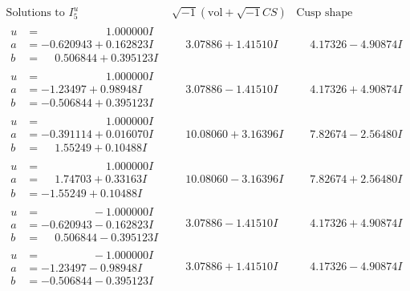 \documentclass[1p]{elsarticle_modified}
\theoremstyle{definition}
\newcommand{\I}{\sqrt{-1}}
\begin{document}
$$\begin{array}{c|c|c}  
\text{Solutions to }I^u_{5}& \I (\text{vol} + \sqrt{-1}CS) & \text{Cusp shape}\\
 \hline 
\begin{aligned}
u &= \phantom{-0.000000 -}1.000000 I \\
a &= -0.620943 + 0.162823 I \\
b &= \phantom{-}0.506844 + 0.395123 I\end{aligned}
 & \phantom{-}3.07886 + 1.41510 I & \phantom{-}4.17326 - 4.90874 I \\ \hline\begin{aligned}
u &= \phantom{-0.000000 -}1.000000 I \\
a &= -1.23497 + 0.98948 I \\
b &= -0.506844 + 0.395123 I\end{aligned}
 & \phantom{-}3.07886 - 1.41510 I & \phantom{-}4.17326 + 4.90874 I \\ \hline\begin{aligned}
u &= \phantom{-0.000000 -}1.000000 I \\
a &= -0.391114 + 0.016070 I \\
b &= \phantom{-}1.55249 + 0.10488 I\end{aligned}
 & \phantom{-}10.08060 + 3.16396 I & \phantom{-}7.82674 - 2.56480 I \\ \hline\begin{aligned}
u &= \phantom{-0.000000 -}1.000000 I \\
a &= \phantom{-}1.74703 + 0.33163 I \\
b &= -1.55249 + 0.10488 I\end{aligned}
 & \phantom{-}10.08060 - 3.16396 I & \phantom{-}7.82674 + 2.56480 I \\ \hline\begin{aligned}
u &= \phantom{-0.000000 } -1.000000 I \\
a &= -0.620943 - 0.162823 I \\
b &= \phantom{-}0.506844 - 0.395123 I\end{aligned}
 & \phantom{-}3.07886 - 1.41510 I & \phantom{-}4.17326 + 4.90874 I \\ \hline\begin{aligned}
u &= \phantom{-0.000000 } -1.000000 I \\
a &= -1.23497 - 0.98948 I \\
b &= -0.506844 - 0.395123 I\end{aligned}
 & \phantom{-}3.07886 + 1.41510 I & \phantom{-}4.17326 - 4.90874 I \\ \hline\begin{aligned}

\end{aligned}
\end{array}$$
\end{document}
